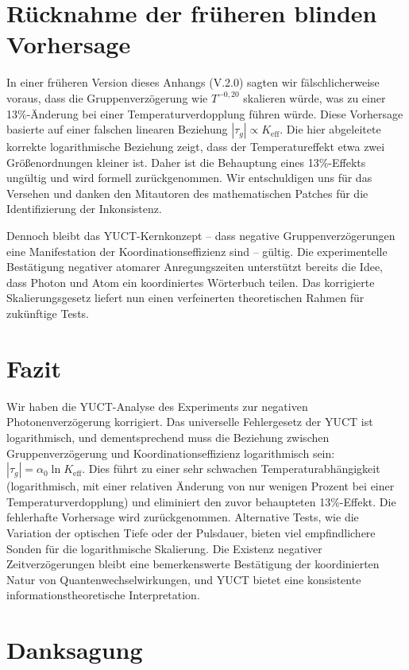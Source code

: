 \documentclass[12pt,a4paper]{article}
\newcommand{\Keff}{K_{\mathrm{eff}}}
\begin{document}
	\section{Rücknahme der früheren blinden Vorhersage}
	
	In einer früheren Version dieses Anhangs (V.2.0) sagten wir fälschlicherweise voraus, dass die Gruppenverzögerung wie \(T^{-0,20}\) skalieren würde, was zu einer 13\%-Änderung bei einer Temperaturverdopplung führen würde. Diese Vorhersage basierte auf einer falschen linearen Beziehung \(|\tau_g| \propto \Keff\). Die hier abgeleitete korrekte logarithmische Beziehung zeigt, dass der Temperatureffekt etwa zwei Größenordnungen kleiner ist. Daher ist die Behauptung eines 13\%-Effekts ungültig und wird formell zurückgenommen. Wir entschuldigen uns für das Versehen und danken den Mitautoren des mathematischen Patches für die Identifizierung der Inkonsistenz.
	
	Dennoch bleibt das YUCT-Kernkonzept – dass negative Gruppenverzögerungen eine Manifestation der Koordinationseffizienz sind – gültig. Die experimentelle Bestätigung negativer atomarer Anregungszeiten unterstützt bereits die Idee, dass Photon und Atom ein koordiniertes Wörterbuch teilen. Das korrigierte Skalierungsgesetz liefert nun einen verfeinerten theoretischen Rahmen für zukünftige Tests.
	
	\section{Fazit}
	
	Wir haben die YUCT-Analyse des Experiments zur negativen Photonenverzögerung korrigiert. Das universelle Fehlergesetz der YUCT ist logarithmisch, und dementsprechend muss die Beziehung zwischen Gruppenverzögerung und Koordinationseffizienz logarithmisch sein: \(|\tau_g| = \alpha_0 \ln\Keff\). Dies führt zu einer sehr schwachen Temperaturabhängigkeit (logarithmisch, mit einer relativen Änderung von nur wenigen Prozent bei einer Temperaturverdopplung) und eliminiert den zuvor behaupteten 13\%-Effekt. Die fehlerhafte Vorhersage wird zurückgenommen. Alternative Tests, wie die Variation der optischen Tiefe oder der Pulsdauer, bieten viel empfindlichere Sonden für die logarithmische Skalierung. Die Existenz negativer Zeitverzögerungen bleibt eine bemerkenswerte Bestätigung der koordinierten Natur von Quantenwechselwirkungen, und YUCT bietet eine konsistente informationstheoretische Interpretation.
	
	\section*{Danksagung}
	
\end{document}
